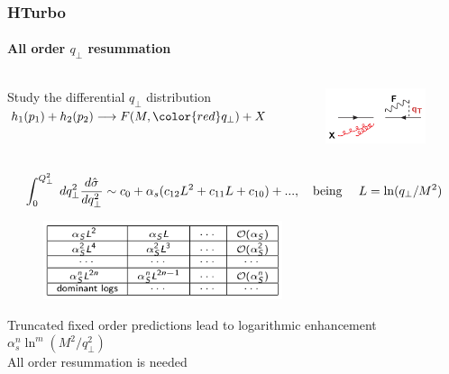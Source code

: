 \documentclass[aspectratio=43]{beamer}
\begin{document}
\begin{frame}
	
	\frametitle{HTurbo}
	\framesubtitle{All order $q_{\perp}$ resummation}
	
	\begin{columns}
		
		
		\center	\footnotesize Study the differential $q_{\perp}$ distribution \\
		\center	$h_{1}(p_{1}) + h_{2}(p_{2}) \longrightarrow F(M, {\color{red}q_{\perp}}) + X$
		
		
		\begin{figure}
			\includegraphics[width = 3.5cm]{plots/section2/qT_diagram.png}
		\end{figure}
		
	\end{columns}
	
	\footnotesize {$$\int_{0}^{Q_{\perp}^{2}} \; dq_{\perp}^{2} \frac{d\hat{\sigma}}{dq_{\perp}^{2}} \sim c_{0} + \alpha_{s}(c_{12}L^{2} + c_{11}L + c_{10}) + ..., \textrm{\quad being \quad} L = \ln (q_{\perp} / M^{2})$$}
	
	\begin{figure}
		\includegraphics[width = 7cm]{plots/section2/qT_logs_table.png}
	\end{figure}
	
	\footnotesize Truncated fixed order predictions lead to {\color{red} logarithmic enhancement $\alpha_{s}^{n}\ln^{m}(M^{2}/q_{\perp}^{2})$} \\
	\center \footnotesize {\color{red} All order resummation is needed} \\

\end{frame}
\end{document}

